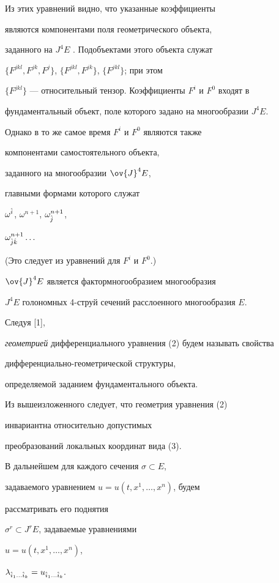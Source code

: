 Из этих уравнений видно, что указанные коэффициенты 


являются компонентами поля геометрического объекта,


заданного на $J^4E$ . Подобъектами этого объекта служат


$\{F^{jkl},F^{jk},F^j\}$, $\{F^{jkl},F^{jk}\}$, $\{F^{jkl}\}$; при этом


$\{F^{jkl}\}$ --- относительный тензор. Коэффициенты $F^i$ и $F^0$ входят в


фундаментальный объект, поле которого задано на многообразии $J^4E$.


Однако в то же самое время $F^i$ и $F^0$ являются также


компонентами самостоятельного объекта,


заданного на многообразии $\ov{J}^4E$, 


главными формами которого служат


$\omega^{\Hat{i}}$, $\omega^{n+1}$, $\omega^{n+1}_{\Hat{j}}$,


$\omega^{n+1}_{\Hat{j}\Hat{k}}\dotsc$


(Это следует из уравнений для $F^i$ и $F^0$.)\;


$\ov{J}^4E$ является фактормногообразием многообразия


$J^4E$ голономных 4-струй сечений расслоенного многообразия $E$.


Следуя [1],


{\it геометрией} дифференциального уравнения (2) будем называть свойства


дифференциально-геометрической структуры, 


определяемой заданием фундаментального объекта.





Из вышеизложенного следует, что геометрия уравнения (2) 


инвариантна относительно допустимых


преобразований локальных координат вида (3).


В дальнейшем для каждого сечения $\sigma\subset E$,


задаваемого уравнением $u=u(t,x^1,\dotsc,x^n)$, будем


рассматривать его поднятия


$\sigma^r\subset J^rE$, задаваемые уравнениями


$u=u(t,x^1,\dotsc,x^n)$,


$\lambda_{\Hat{i}_1\dotsc\Hat{i}_k}=u_{\Hat{i}_1\dotsc\Hat{i}_k}.$





